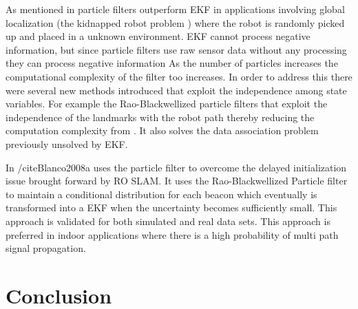 \documentclass[conference]{IEEEtran}
\begin{document}
As mentioned in \cite{Thrun2002a} particle filters outperform EKF in applications involving global localization (the kidnapped robot problem ) where the robot is randomly picked up and placed in a unknown environment. 
EKF cannot process negative information, but since particle filters use raw sensor data without any processing they can process negative information\cite{Thrun2002a}
As the number of particles increases the computational complexity of the filter too increases. In order to address this there were several new methods introduced that  exploit the independence among state variables. For example the Rao-Blackwellized particle filters that exploit the independence of the landmarks with the robot path thereby reducing the computation complexity from \cite{Yuan2012}. It also solves the data association problem previously unsolved by EKF.
	

In /cite{Blanco2008a} uses the particle filter to overcome the delayed initialization issue brought forward by RO SLAM. It uses the Rao-Blackwellized Particle filter to maintain a conditional distribution for each beacon which eventually is transformed into a EKF when the uncertainty becomes sufficiently small. This approach is validated for both simulated and real data sets. This approach is preferred in indoor applications where there is a high probability of multi path signal propagation.

	
	
	
	
	
	
	
	
	
	
	
	
	
	
	
	
	\section{Conclusion}
	\label{conclusion}
	
	
	
	
	
	
	
	
	
	
	
\end{document}
